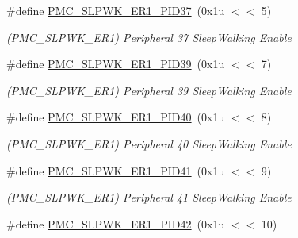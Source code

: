 \begin{DoxyCompactItemize}
\mbox{\label{group__SAMV71__PMC_ga69f970e7ea026d4b22a1ca182c755bb8}} 
\#define \mbox{\hyperlink{group__SAMV71__PMC_ga69f970e7ea026d4b22a1ca182c755bb8}{P\+M\+C\+\_\+\+S\+L\+P\+W\+K\+\_\+\+E\+R1\+\_\+\+P\+I\+D37}}~(0x1u $<$$<$ 5)
\begin{DoxyCompactList}\small\item\em (P\+M\+C\+\_\+\+S\+L\+P\+W\+K\+\_\+\+E\+R1) Peripheral 37 Sleep\+Walking Enable \end{DoxyCompactList}\item 
\mbox{\label{group__SAMV71__PMC_gaf0e4fb57be2f5ebbe3e27183a3ed8c40}} 
\#define \mbox{\hyperlink{group__SAMV71__PMC_gaf0e4fb57be2f5ebbe3e27183a3ed8c40}{P\+M\+C\+\_\+\+S\+L\+P\+W\+K\+\_\+\+E\+R1\+\_\+\+P\+I\+D39}}~(0x1u $<$$<$ 7)
\begin{DoxyCompactList}\small\item\em (P\+M\+C\+\_\+\+S\+L\+P\+W\+K\+\_\+\+E\+R1) Peripheral 39 Sleep\+Walking Enable \end{DoxyCompactList}\item 
\mbox{\label{group__SAMV71__PMC_gabef08907d93b2e1f0bc8706673cf5075}} 
\#define \mbox{\hyperlink{group__SAMV71__PMC_gabef08907d93b2e1f0bc8706673cf5075}{P\+M\+C\+\_\+\+S\+L\+P\+W\+K\+\_\+\+E\+R1\+\_\+\+P\+I\+D40}}~(0x1u $<$$<$ 8)
\begin{DoxyCompactList}\small\item\em (P\+M\+C\+\_\+\+S\+L\+P\+W\+K\+\_\+\+E\+R1) Peripheral 40 Sleep\+Walking Enable \end{DoxyCompactList}\item 
\mbox{\label{group__SAMV71__PMC_ga5e45794d9cd85a7239f619bd39719ec3}} 
\#define \mbox{\hyperlink{group__SAMV71__PMC_ga5e45794d9cd85a7239f619bd39719ec3}{P\+M\+C\+\_\+\+S\+L\+P\+W\+K\+\_\+\+E\+R1\+\_\+\+P\+I\+D41}}~(0x1u $<$$<$ 9)
\begin{DoxyCompactList}\small\item\em (P\+M\+C\+\_\+\+S\+L\+P\+W\+K\+\_\+\+E\+R1) Peripheral 41 Sleep\+Walking Enable \end{DoxyCompactList}\item 
\mbox{\label{group__SAMV71__PMC_ga69395c66e87ccc2b25a2981d6be95608}} 
\#define \mbox{\hyperlink{group__SAMV71__PMC_ga69395c66e87ccc2b25a2981d6be95608}{P\+M\+C\+\_\+\+S\+L\+P\+W\+K\+\_\+\+E\+R1\+\_\+\+P\+I\+D42}}~(0x1u $<$$<$ 10)
$$
\end{DoxyCompactItemize}
